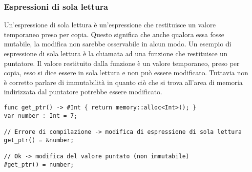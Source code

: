 \subsubsection{Espressioni di sola lettura}
Un'espressione di sola lettura è un'espressione che restituisce un valore temporaneo preso per copia. Questo 
significa che anche qualora essa fosse mutabile, la modifica non sarebbe osservabile in alcun modo. Un esempio di 
espressione di sola lettura è la chiamata ad una funzione che restituisce un puntatore. Il valore restituito dalla 
funzione è un valore temporaneo, preso per copia, esso si dice essere in sola lettura e non può essere modificato.
Tuttavia non è corretto parlare di immutabilità in quanto ciò che si trova all'area di memoria indirizzata dal 
puntatore potrebbe essere modificato.

\vspace{0.5cm}
\begin{lstlisting}[frame=single]
func get_ptr() -> #Int { return memory::alloc<Int>(); }
var number : Int = 7;

// Errore di compilazione -> modifica di espressione di sola lettura
get_ptr() = &number;

// Ok -> modifica del valore puntato (non immutabile)
#get_ptr() = number;

\end{lstlisting}
\vspace{0.5cm}
